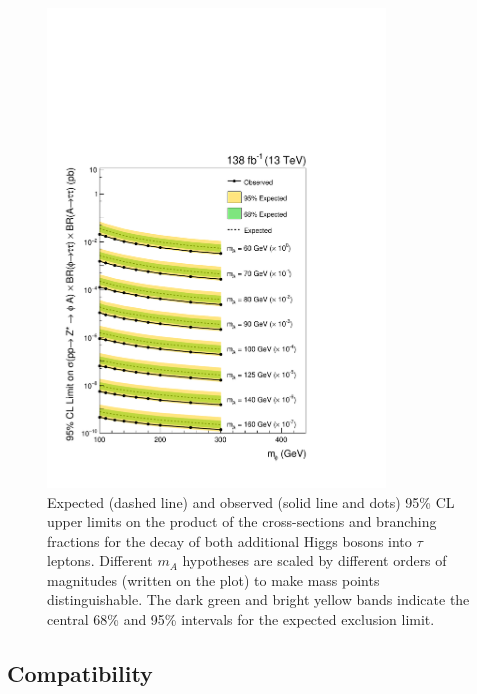 \begin{figure}[!hbtp]
\centering
    \includegraphics[width=0.8\textwidth]{Figures/model_independent_limit_all.pdf}
\caption[Plot of the model-independent limits on the cross-section of the production from an off-shell Z boson multiplied by the branching fractions of $\phi$ and A to $\tau$ pairs.]{Expected (dashed line) and observed (solid line and dots) 95\% CL upper limits on the product of the cross-sections and branching fractions for the decay of both additional Higgs bosons into $\tau$ leptons. Different $m_{A}$ hypotheses are scaled by different orders of magnitudes (written on the plot) to make mass points distinguishable. The dark green and bright yellow bands indicate the central 68\% and 95\% intervals for the expected exclusion limit.}
\label{fig:4tau_mi}
\end{figure}

\subsection{Compatibility}


